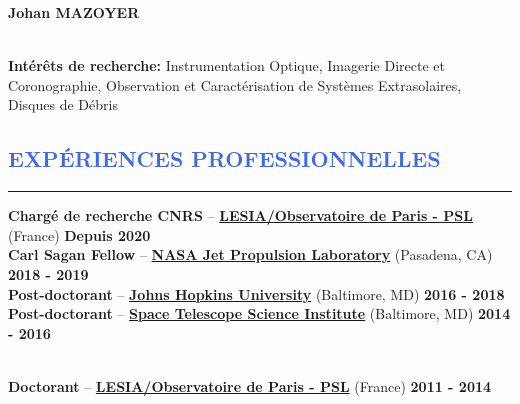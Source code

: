 \documentclass[11pt, a4paper, french]{article}
\begin{document}
\lfoot{\textcolor{Gray}{CV mis à jour en \yeardate\today}}

\begin{huge}
\noindent\textbf{Johan MAZOYER}
\end{huge}\\

\textbf{Intérêts de recherche:} Instrumentation Optique, Imagerie Directe et Coronographie,
Observation et Caractérisation de Systèmes Extrasolaires, Disques de Débris\\





\vspace{-1.1cm}
\textcolor{RoyalBlue}{\section{\large EXPÉRIENCES PROFESSIONNELLES}
\vspace{-0.2cm}\hrule}
\vspace{0.4cm}


\textbf{Chargé de recherche CNRS} --
\href{https://lesia.obspm.fr/}{\textbf{LESIA/Observatoire de Paris - PSL}} (France)
\hfill     	 { \bf Depuis 2020}\\

\vspace{-0.11cm}
\textbf{Carl Sagan Fellow} --
\href{https://www.jpl.nasa.gov/}{\textbf{NASA Jet Propulsion Laboratory}} (Pasadena, CA)
\hfill      { \bf 2018 - 2019}\\

\vspace{-0.11cm}
\textbf{Post-doctorant} --
\href{http://physics-astronomy.jhu.edu/}{\textbf{Johns Hopkins University}} (Baltimore, MD)
\hfill   	 { \bf 2016 - 2018}\\

\vspace{-0.11cm}
\textbf{Post-doctorant} --
\href{http://www.stsci.edu}{\textbf{Space Telescope Science Institute}} (Baltimore, MD)
\hfill        { \bf 2014 - 2016}\\\

\vspace{-0.11cm}
\textbf{Doctorant} --
\href{https://lesia.obspm.fr/}{\textbf{LESIA/Observatoire de Paris - PSL}} (France)
\hfill        { \bf 2011 - 2014}\\
\end{document}

